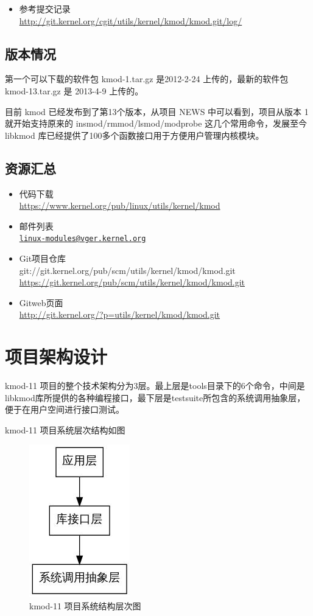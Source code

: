 \begin{itemize}
\item
  参考提交记录\\
  \url{http://git.kernel.org/cgit/utils/kernel/kmod/kmod.git/log/}
\end{itemize}
\subsection{版本情况}

第一个可以下载的软件包 kmod-1.tar.gz 是2012-2-24 上传的，最新的软件包
kmod-13.tar.gz 是 2013-4-9 上传的。

目前 kmod 已经发布到了第13个版本，从项目 NEWS 中可以看到，项目从版本 1
就开始支持原来的 insmod/rmmod/lsmod/modprobe
这几个常用命令，发展至今libkmod
库已经提供了100多个函数接口用于方便用户管理内核模块。

\subsection{资源汇总}

\begin{itemize}
\item
  代码下载\\ \url{https://www.kernel.org/pub/linux/utils/kernel/kmod}
\item
  邮件列表\\
  \href{mailto:linux-modules@vger.kernel.org}{\texttt{linux-modules@vger.kernel.org}}
\item
  Git项目仓库\\
  git://git.kernel.org/pub/scm/utils/kernel/kmod/kmod.git\\
  \url{https://git.kernel.org/pub/scm/utils/kernel/kmod/kmod.git}
\item
  Gitweb页面\\ \url{http://git.kernel.org/?p=utils/kernel/kmod/kmod.git}
\end{itemize}
\section{项目架构设计}

kmod-11
项目的整个技术架构分为3层。最上层是tools目录下的6个命令，中间是libkmod库所提供的各种编程接口，最下层是testsuite所包含的系统调用抽象层，便于在用户空间进行接口测试。

kmod-11 项目系统层次结构如图

\begin{figure}[htbp]
\centering
\includegraphics{./figures/0-overview.jpg}
\caption{kmod-11 项目系统结构层次图}
\end{figure}

